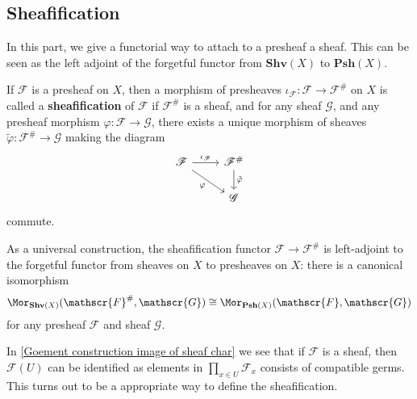 \subsection{Sheafification}
In this part, we give a functorial way to attach to a presheaf a sheaf. This can be seen as the left adjoint of the forgetful functor from $\mathbf{Shv}(X)$ to $\mathbf{Psh}(X)$.
\begin{definition}
If $\mathscr{F}$ is a presheaf on $X$, then a morphism of presheaves $\iota_{\mathscr{F}}:\mathscr{F}\to\mathscr{F}^{\#}$ on $X$ is called a \textbf{sheafification} of $\mathscr{F}$ if $\mathscr{F}^{\#}$ is a sheaf, and for any sheaf $\mathscr{G}$, and any presheaf morphism $\varphi:\mathscr{F}\to\mathscr{G}$, there exists a unique morphism of sheaves $\tilde{\varphi}:\mathscr{F}^{\#}\to\mathscr{G}$ making the diagram
\[\begin{tikzcd}
\mathscr{F}\ar[rd,swap,"\varphi"]\ar[r,"\iota_{\mathscr{F}}"]&\mathscr{F}^{\#}\ar[d,"\tilde{\varphi}"]\\
&\mathscr{G}
\end{tikzcd}\]
commute.\par
As a universal construction, the sheafification functor $\mathscr{F}\to\mathscr{F}^{\#}$ is left-adjoint to the forgetful functor from sheaves on $X$ to presheaves on $X$: there is a canonical isomorphism
\[\Mor_{\mathbf{Shv}(X)}(\mathscr{F}^{\#},\mathscr{G})\cong\Mor_{\mathbf{Psh}(X)}(\mathscr{F},\mathscr{G})\]
for any presheaf $\mathscr{F}$ and sheaf $\mathscr{G}$.
\end{definition}
In \cref{Goement construction image of sheaf char} we see that if $\mathscr{F}$ is a sheaf, then $\mathscr{F}(U)$ can be identified as elements in $\prod_{x\in U}\mathscr{F}_x$ consists of compatible germs. This turns out to be a appropriate way to define the sheafification.
